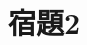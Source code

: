 \documentclass[class=jsarticle, crop=false, dvipdfmx, fleqn]{standalone}
\begin{document}
\section*{宿題2}
\end{document}
